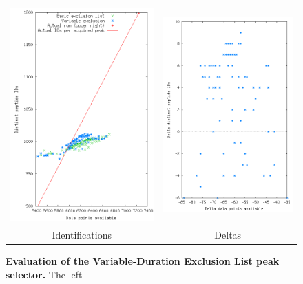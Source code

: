 \documentclass[12pt,twoside,openright]{report}
\begin{document}
\begin{figure}
\centering
\begin{tabular}{cc}
\includegraphics[width=3.0in]{2_variable2.png} &
\includegraphics[width=3.0in]{2b_variable2.png} \\
Identifications & Deltas \\
\end{tabular}
\caption[Evaluation of the Variable-Duration Exclusion List peak selector]{{\bf
    Evaluation of the Variable-Duration Exclusion List peak selector.}  The left
}
\end{figure}
\end{document}
